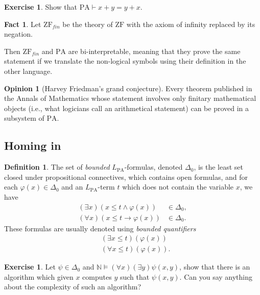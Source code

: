 \documentclass{article}
\theoremstyle{definition}
\newtheorem{excs}[thrm]{Exercise}
\newtheorem{fact}[thrm]{Fact}
\newtheorem{opin}[thrm]{Opinion}
\newtheorem{defi}[thrm]{Definition}
\newcommand{\NN}{\mathbb{N}}
\newcommand{\PA}{\text{PA}}
\begin{document}
\begin{excs}
    Show that $\PA \vdash x+y = y+x$.
\end{excs}

\begin{fact}
    Let $\text{ZF}_{fin}$ be the theory of $\text{ZF}$ with the axiom of infinity replaced by its negation. 
    
    Then $\text{ZF}_{fin}$ and $\PA$ are bi-interpretable, meaning that they prove the same statement if we translate the non-logical symbols using their definition in the other language.
\end{fact}

\begin{opin}[Harvey Friedman's grand conjecture]
    Every theorem published in the Annals of Mathematics whose statement involves only finitary mathematical objects (i.e., what logicians call an arithmetical statement) can be proved in a subsystem of $\PA$.
\end{opin}

\subsection*{Homing in}

\begin{defi}
    The set of \emph{bounded} $L_\PA$-formulas, denoted $\Delta_0$, is the least set closed under propositional connectives, which contains open formulas, and for each $\varphi(x)\in \Delta_0$ and an $L_\PA$-term $t$ which does not contain the variable $x$, we have
    \begin{align*}
        (\exists x)(x \leq t \land \varphi(x))&\in\Delta_0,\\
        (\forall x)(x \leq t \to \varphi(x))&\in\Delta_0.
    \end{align*}
    These formulas are usually denoted using \emph{bounded quantifiers}
    \begin{align*}
        &(\exists x \leq t)(\varphi(x))\\
        &(\forall x \leq t)(\varphi(x)).
    \end{align*}
\end{defi}

\begin{excs}
    Let $\psi\in\Delta_0$ and $\NN \models (\forall x)(\exists y)\psi(x,y)$, show that there is an algorithm which given $x$ computes $y$ such that $\psi(x,y)$. Can you say anything about the complexity of such an algorithm?
\end{excs}
\end{document}
